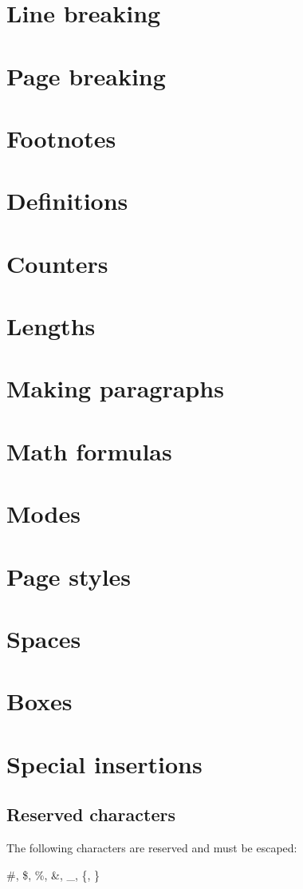 \documentclass[11pt]{article}
\begin{document}
\section{Line breaking}%
\section{Page breaking}%
\section{Footnotes}%
\section{Definitions}%
\section{Counters}%
\section{Lengths}%
\section{Making paragraphs}%
\section{Math formulas}%
\section{Modes}%
\section{Page styles}%
\section{Spaces}%
\section{Boxes}%
\section{Special insertions}
\subsection{Reserved characters}
The following characters are reserved and must be escaped:
\begin{center}
    \#, \$, \%, \&, \_, \{, \}
\end{center}
\end{document}
